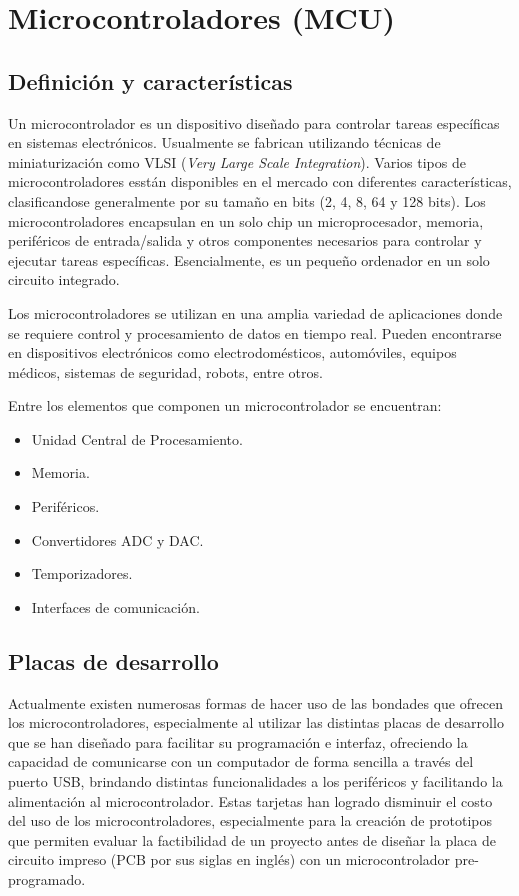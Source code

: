 \section{Microcontroladores (MCU)}

\subsection{Definición y características}

Un microcontrolador es un dispositivo diseñado para controlar tareas específicas en sistemas electrónicos. Usualmente se fabrican utilizando técnicas de miniaturización como VLSI (\textit{Very Large Scale Integration}). Varios tipos de microcontroladores esstán disponibles en el mercado con diferentes características, clasificandose generalmente por su tamaño en bits (2, 4, 8, 64 y 128 bits). Los microcontroladores encapsulan en un solo chip un microprocesador, memoria, periféricos de entrada/salida y otros componentes necesarios para controlar y ejecutar tareas específicas. Esencialmente, es un pequeño ordenador en un solo circuito integrado.

Los microcontroladores se utilizan en una amplia variedad de aplicaciones donde se requiere control y procesamiento de datos en tiempo real. Pueden encontrarse en dispositivos electrónicos como electrodomésticos, automóviles, equipos médicos, sistemas de seguridad, robots, entre otros.

Entre los elementos que componen un microcontrolador se encuentran:

\begin{itemize}
    \item Unidad Central de Procesamiento.
    \item Memoria.
    \item Periféricos.
    \item Convertidores ADC y DAC.
    \item Temporizadores.
    \item Interfaces de comunicación.
\end{itemize}

\subsection{Placas de desarrollo}

Actualmente existen numerosas formas de hacer uso de las bondades que ofrecen los microcontroladores, especialmente al utilizar las distintas placas de desarrollo que se han diseñado para facilitar su programación e interfaz, ofreciendo la capacidad de comunicarse con un computador de forma sencilla a través del puerto USB, brindando distintas funcionalidades a los periféricos y facilitando la alimentación al microcontrolador. Estas tarjetas han logrado disminuir el costo del uso de los microcontroladores, especialmente para la creación de prototipos que permiten evaluar la factibilidad de un proyecto antes de diseñar la placa de circuito impreso (PCB por sus siglas en inglés) con un microcontrolador pre-programado.

